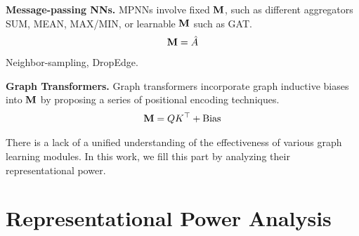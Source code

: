 \documentclass{article} %
\begin{document}
\textbf{Message-passing NNs.}
MPNNs involve fixed ${\mathbf{M}}$, such as different aggregators SUM, MEAN, MAX/MIN, or learnable ${\mathbf{M}}$ such as GAT.
\begin{equation}
	\begin{aligned}
		{\mathbf{M}}=\hat A
	\end{aligned}
\end{equation}
Neighbor-sampling, DropEdge.

\textbf{Graph Transformers.}
Graph transformers incorporate graph inductive biases into ${\mathbf{M}}$ by proposing a series of positional encoding techniques.
\begin{equation}
	\begin{aligned}
		{\mathbf{M}}=QK^{\top}+\textrm{Bias}
	\end{aligned}
\end{equation}

There is a lack of a unified understanding of the effectiveness of various graph learning modules.
In this work, we fill this part by analyzing their representational power.

\section{Representational Power Analysis}

\end{document}
